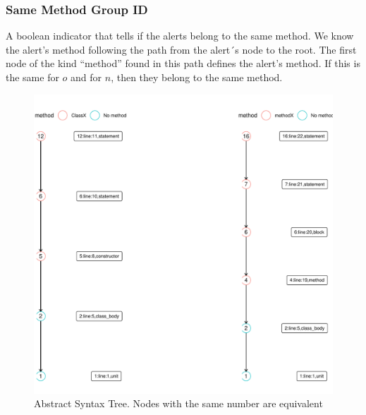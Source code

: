\documentclass[
]{article}
\begin{document}
\small

\begin{table}[H]

\caption{\label{tab:unnamed-chunk-7}Same group feature \label{same_group}}
\centering
{}
\end{table}

\normalsize

\subsubsection {Same Method Group ID}

A boolean indicator that tells if the alerts belong to the same method.
We know the alert's method following the path from the alert´s node to
the root. The first node of the kind ``method'' found in this path
defines the alert's method. If this is the same for \(o\) and for \(n\),
then they belong to the same method.

\small

\begin{figure}[H]
\includegraphics[width=1\linewidth]{report_files/figure-latex/unnamed-chunk-8-1} \caption{Abstract Syntax Tree. Nodes with the same number are equivalent \label{AST_with_alerts}}\label{fig:unnamed-chunk-8}
\end{figure}
\end{document}
